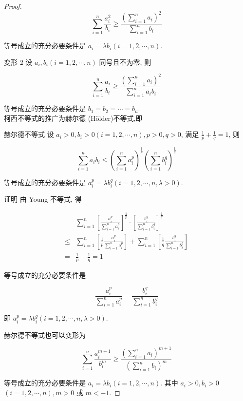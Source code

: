 \begin{proof}
	$$
	\sum_{i=1}^{n} \frac{a_{i}^{2}}{b_{i}} \geqslant \frac{\left(\sum_{i=1}^{n} a_{i}\right)^{2}}{\sum_{i=1}^{n} b_{i}}
	$$
	
	等号成立的充分必要条件是 $a_{i}=\lambda b_{i}(i=1,2, \cdots, n)$.
	
	变形 2 设 $a_{i}, b_{i}(i=1,2, \cdots, n)$ 同号且不为零, 则
	
	$$
	\sum_{i=1}^{n} \frac{a_{i}}{b_{i}} \geqslant \frac{\left(\sum_{i=1}^{n} a_{i}\right)^{2}}{\sum_{i=1}^{n} a_{i} b_{i}}
	$$
	
	等号成立的充分必要条件是 $b_{1}=b_{2}=\cdots=b_{n}$.\\
	柯西不等式的推广为赫尔德 (Hölder)不等式,即
	
	赫尔德不等式 设 $a_{i}>0, b_{i}>0(i=1,2, \cdots, n), p>0, q>0$, 满足 $\frac{1}{p}+\frac{1}{q}=1$, 则
	
	$$
	\sum_{i=1}^{n} a_{i} b_{i} \leqslant\left(\sum_{i=1}^{n} a_{i}^{p}\right)^{\frac{1}{p}}\left(\sum_{i=1}^{n} b_{i}^{q}\right)^{\frac{1}{q}}
	$$
	
	等号成立的充分必要条件是 $a_{i}^{p}=\lambda b_{i}^{q}(i=1,2, \cdots, n, \lambda>0)$.
	
	证明 由 Young 不等式, 得
	
	$$
	\begin{aligned}
	& \sum_{i=1}^{n}\left[\frac{a_{i}^{p}}{\sum_{i=1}^{n} a_{i}^{p}}\right]^{\frac{1}{p}} \cdot\left[\frac{b_{i}^{q}}{\sum_{i=1}^{n} b_{i}^{q}}\right]^{\frac{1}{q}} \\
	\leqslant & \sum_{i=1}^{n}\left[\frac{1}{p} \frac{a_{i}^{p}}{\sum_{i=1}^{n} a_{i}^{p}}\right]+\sum_{i=1}^{n}\left[\frac{1}{q} \frac{b_{i}^{q}}{\sum_{i=1}^{n} b_{i}^{q}}\right] \\
	= & \frac{1}{p}+\frac{1}{q}=1
	\end{aligned}
	$$
	
	等号成立的充分必要条件是
	
	$$
	\frac{a_{i}^{p}}{\sum_{i=1}^{n} a_{i}^{p}}=\frac{b_{i}^{q}}{\sum_{i=1}^{n} b_{i}^{q}}
	$$
	
	即 $a_{i}^{p}=\lambda b_{i}^{q}(i=1,2, \cdots, n, \lambda>0)$.
	
	赫尔德不等式也可以变形为
	
	$$
	\sum_{i=1}^{n} \frac{a_{i}^{m+1}}{b_{i}^{m}} \geqslant \frac{\left(\sum_{i=1}^{n} a_{i}\right)^{m+1}}{\left(\sum_{i=1}^{n} b_{i}\right)^{m}}
	$$
	
	等号成立的充分必要条件是 $a_{i}=\lambda b_{i}(i=1,2, \cdots, n)$. 其中 $a_{i}>0, b_{i}>0$ $(i=1,2, \cdots, n), m>0$ 或 $m<-1$.
	

\end{proof}
